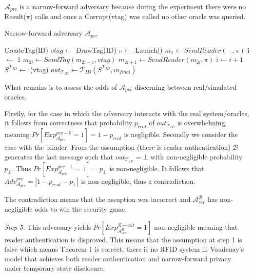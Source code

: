     $\mathcal{A}_{prv}$ is a narrow-forward adversary because during the experiment there were no Result($\pi$) calls and once a Corrupt(vtag) was called 
    no other oracle was queried.

    \begin{algorithm}[H] %
        \centering
        \caption{Narrow-forward adversary $\mathcal{A}_{prv}$}
        \begin{algorithmic}[1] %
            \State CreateTag(ID)
            \State $vtag \leftarrow$ DrawTag(ID)
            \State $\pi \leftarrow$ Launch() 
            \State $m_1 \leftarrow SendReader(-,\pi)$ 
            \State i $\leftarrow$ 1
                \State $m_{2i} \gets SendTag(m_{2i-1}, vtag)$ 
                \State $m_{2i+1} \gets SendReader(m_{2i}, \pi)$
                \State $i \gets i+1$
            \EndWhile
            \State $S^{\mathcal{T}_{ID}} \gets$ (vtag)
            \State $out_{\mathcal{T}_{ID}} \gets \mathcal{T}_{ID}(S^{\mathcal{T}_{ID}}, m_{final})$
                \State {}
            \Else
                \State {}
            \EndIf
        \end{algorithmic}
    \end{algorithm}

    What remains is to assess the odds of $\mathcal{A}_{prv}$ discerning between real/simulated oracles.

    Firstly, for the case in which the adversary interacts with the real system/oracles, it follows from correctness that probability $p_{real}$ of 
    $out_{\mathcal{T}_{ID}}$ is overwhelming, meaning $Pr[Exp_{\mathcal{A}_{prv}}^{prv-0} = 1] = 1-p_{real}$ is negligible. Secondly we consider the case
    with the blinder. From the assumption (there is reader authentication) $\mathcal{B}$ generates the last message such that $out_{\mathcal{T}_{ID}} = \bot$ with non-negligible probability $p_{\bot}$.
    Thus $Pr[Exp_{\mathcal{A}_{prv}}^{prv-1} = 1] = p_{\bot}$ is non-negligible. It follows that $Adv_{\mathcal{A}_{prv}}^{prv} = |1-p_{real}-p_{\bot}|$ is non-negligible,
    thus a contradiction. 

    The contradiction means that the assuption was incorrect and $\mathcal{A}_{sec}^{\mathcal{B}}$ has non-negligible odds to win the security game.

    \textit{Step 5.} This adversary yields $Pr[Exp_{\mathcal{A}_{sec}^{B}}^{\mathcal{R}-aut} = 1]$ non-negligible meaning that reader authentication is disproved. 
    This means that the assumption at step 1 is false which means Theorem 1 is correct: there is no RFID system in Vaudenay's model that achieves both reader authentication and narrow-forward privacy 
    under temporary state disclosure.

